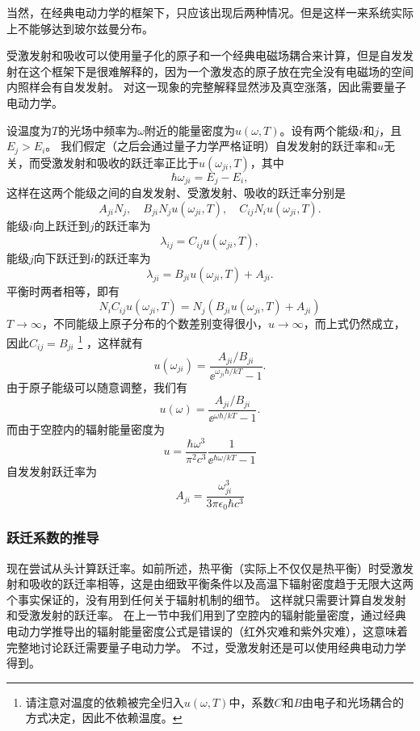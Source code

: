 当然，在经典电动力学的框架下，只应该出现后两种情况。但是这样一来系统实际上不能够达到玻尔兹曼分布。

受激发射和吸收可以使用量子化的原子和一个经典电磁场耦合来计算，但是自发发射在这个框架下是很难解释的，因为一个激发态的原子放在完全没有电磁场的空间内照样会有自发发射。
对这一现象的完整解释显然涉及真空涨落，因此需要量子电动力学。

设温度为$T$的光场中频率为$\omega$附近的能量密度为$u(\omega, T)$。设有两个能级$i$和$j$，且$E_j > E_i$。
我们假定（之后会通过量子力学严格证明）自发发射的跃迁率和$u$无关，而受激发射和吸收的跃迁率正比于$u(\omega_{ji}, T)$，其中
\begin{equation}
    \hbar \omega_{ji} = E_j - E_i,
    \label{eq:photon-energy}
\end{equation}
这样在这两个能级之间的自发发射、受激发射、吸收的跃迁率分别是
\[
    A_{ji} N_j, \quad B_{ji} N_j u(\omega_{ji}, T), \quad C_{ij} N_i u(\omega_{ji}, T).
\]
能级$i$向上跃迁到$j$的跃迁率为
\[
    \lambda_{ij} = C_{ij} u(\omega_{ji}, T),
\]
能级$j$向下跃迁到$i$的跃迁率为
\[
    \lambda_{ji} = B_{ji} u(\omega_{ji}, T) + A_{ji}.
\]
平衡时两者相等，即有
\[
    N_i C_{ij} u(\omega_{ji}, T) = N_j (B_{ji} u(\omega_{ji}, T) + A_{ji})
\]
$T \to \infty$，不同能级上原子分布的个数差别变得很小，$u \to \infty$，而上式仍然成立，因此$C_{ij} = B_{ji}$%
\footnote{请注意对温度的依赖被完全归入$u(\omega, T)$中，系数$C$和$B$由电子和光场耦合的方式决定，因此不依赖温度。}%
，这样就有
\[
    u(\omega_{ji}) = \frac{A_{ji} / B_{ji}}{\ee^{\omega_{ji} \hbar / k T} - 1}.
\]
由于原子能级可以随意调整，我们有
\[
    u(\omega) = \frac{A_{ji} / B_{ji}}{\ee^{\omega \hbar / k T} - 1}.
\]
而由于空腔内的辐射能量密度为
\[
    u = \frac{\hbar \omega^3}{\pi^2 c^3} \frac{1}{\ee^{\hbar \omega / kT} - 1}
\]
自发发射跃迁率为
\[
    A_{ji} = \frac{\omega_{ji}^3}{3\pi \epsilon_0 \hbar c^3}
\]

\subsubsection{跃迁系数的推导}\label{sec:electro-dipole-hopping}

现在尝试从头计算跃迁率。如前所述，热平衡（实际上不仅仅是热平衡）时受激发射和吸收的跃迁率相等，这是由细致平衡条件以及高温下辐射密度趋于无限大这两个事实保证的，没有用到任何关于辐射机制的细节。
这样就只需要计算自发发射和受激发射的跃迁率。
在上一节中我们用到了空腔内的辐射能量密度，通过经典电动力学推导出的辐射能量密度公式是错误的（红外灾难和紫外灾难），这意味着完整地讨论跃迁需要量子电动力学。
不过，受激发射还是可以使用经典电动力学得到。

